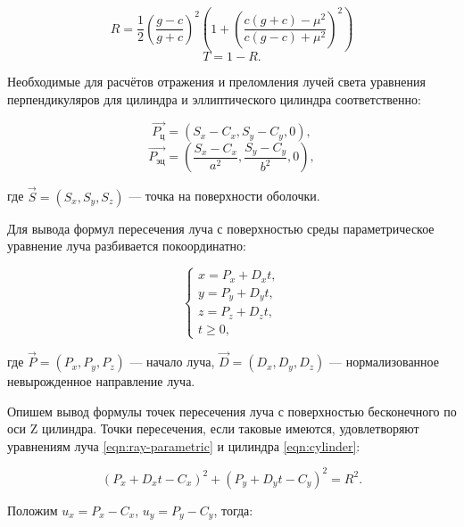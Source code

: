 \begin{equation}
	R = \frac12 \left(\frac{g-c}{g+c}\right)^2 \left(1 + \left(\frac{c(g + c) - \mu^2}{c(g - c) + \mu^2}\right)^2\right)
\end{equation}
\begin{equation}
	\label{eqn:refraction-end}
	T = 1 - R.
\end{equation}

Необходимые для расчётов отражения и преломления лучей света уравнения перпендикуляров для цилиндра и эллиптического цилиндра соответственно:

\begin{equation}
	\label{eqn:perpendicular-cylinder}
	\overrightarrow{P_{\text{ц}}} = (S_x - C_x, S_y - C_y, 0),
\end{equation}
\begin{equation}
	\label{eqn:perpendicular-elliptic-cylinder}
	\overrightarrow{P_{\text{эц}}} = \left(\frac{S_x - C_x}{a^2}, \frac{S_y - C_y}{b^2}, 0\right),
\end{equation}

\noindent где $\vec S = \left(S_x, S_y, S_z\right)$ — точка на поверхности оболочки.

Для вывода формул пересечения луча с поверхностью среды параметрическое уравнение луча разбивается покоординатно:

\begin{equation}
	\label{eqn:ray-parametric}
	\begin{cases}
		x = P_x + D_x t, \\
		y = P_y + D_y t, \\
		z = P_z + D_z t, \\
		t \geqslant 0,
	\end{cases}
\end{equation}

\noindent где $\vec P = (P_x, P_y, P_z)$ — начало луча, $\vec D = (D_x, D_y, D_z)$ — нормализованное невырожденное направление луча.

Опишем вывод формулы точек пересечения луча с поверхностью бесконечного по оси Z цилиндра. Точки пересечения, если таковые имеются, удовлетворяют уравнениям луча \eqref{eqn:ray-parametric} и цилиндра \eqref{eqn:cylinder}:

\begin{equation}
	\label{eqn:cylinder-solve-begin}
	(P_x + D_x t - C_x)^2 + (P_y + D_y t - C_y)^2 = R^2.
\end{equation}

\noindent Положим $u_x = P_x - C_x$, $u_y = P_y - C_y$, тогда:

